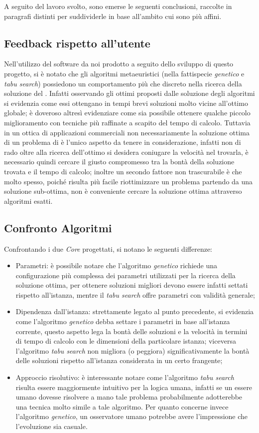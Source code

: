 
A seguito del lavoro svolto, sono emerse le seguenti conclusioni, raccolte in paragrafi distinti per suddividerle in base all'ambito cui sono più affini.

\subsection{Feedback rispetto all'utente}
Nell'utilizzo del software da noi prodotto a seguito dello sviluppo di questo progetto, si è notato che gli algoritmi metaeuristici (nella fattispecie \emph{genetico} e \emph{tabu search}) possiedono un comportamento più che discreto nella ricerca della soluzione del \ddbpp. Infatti osservando gli ottimi proposti dalle soluzione degli algoritmi si evidenzia come essi ottengano in tempi brevi soluzioni molto vicine all'ottimo globale; è doveroso altresì evidenziare come sia possibile ottenere qualche piccolo miglioramento con tecniche più raffinate a scapito del tempo di calcolo. Tuttavia in un ottica di applicazioni commerciali non necessariamente la soluzione ottima di un problema di \ddbp  è l'unico aspetto da tenere in considerazione, infatti non di rado oltre alla ricerca dell'ottimo si desidera coniugare la velocità nel trovarla, è necessario quindi cercare il giusto compromesso tra la bontà della soluzione trovata e il tempo di calcolo; inoltre un secondo fattore non trascurabile è che molto spesso, poiché risulta più facile riottimizzare un problema partendo da una soluzione sub-ottima, non è conveniente cercare la soluzione ottima attraverso algoritmi esatti.

\subsection{Confronto Algoritmi}
Confrontando i due \emph{Core} progettati, si notano le seguenti differenze:
\begin{itemize}
\item Parametri: è possibile notare che l'algoritmo \emph{genetico} richiede una configurazione più complessa dei parametri utilizzati per la ricerca della soluzione ottima, per ottenere soluzioni migliori devono essere infatti settati rispetto all'istanza, mentre il \emph{tabu search} offre parametri con validità generale;
\item Dipendenza dall'istanza: strettamente legato al punto precedente, si evidenzia come l'algoritmo \emph{genetico} debba settare i parametri in base all'istanza corrente, questo aspetto lega la bontà delle soluzioni e la velocità in termini di tempo di calcolo con le dimensioni della particolare istanza; viceversa l'algoritmo \emph{tabu search} non migliora (o peggiora) significativamente la bontà delle soluzioni rispetto all'istanza considerata in un certo frangente;
\item Approccio risolutivo: è interessante notare come l'algoritmo \emph{tabu search} risulta essere maggiormente intuitivo per la logica umana, infatti se un essere umano dovesse risolvere a mano tale problema probabilmente adotterebbe una tecnica molto simile a tale algoritmo. Per quanto concerne invece l'algoritmo \emph{genetico}, un osservatore umano potrebbe avere l'impressione che l'evoluzione sia casuale.
\end{itemize}

